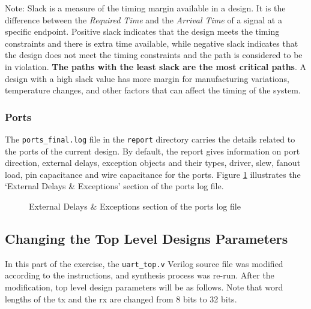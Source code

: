 \documentclass[a4paper,11pt]{article}%
\begin{document}
Note: Slack is a measure of the timing margin available in a design. It is the difference between the \textit{Required Time} and the \textit{Arrival Time} of a signal at a specific endpoint. Positive slack indicates that the design meets the timing constraints and there is extra time available, while negative slack indicates that the design does not meet the timing constraints and the path is considered to be in violation. \textbf{The paths with the least slack are the most critical paths}. A design with a high slack value has more margin for manufacturing variations, temperature changes, and other factors that can affect the timing of the system.



\subsubsection{Ports}

The {\tt ports\_final.log} file in the {\tt report} directory carries the details related to the ports of the current design. By default, the report gives information on port direction, external delays, exception objects and their types, driver, slew, fanout load, pin capacitance and wire capacitance for the ports\cite{genus_command_ref_2019}. Figure \ref{fig:ports_log} illustrates the `External Delays \& Exceptions' section of the ports log file.

\begin{figure}[h]
	\centering
	\caption{External Delays \& Exceptions section of the ports log file}
	\label{fig:ports_log}
\end{figure}

\subsection{Changing the Top Level Designs Parameters}

In this part of the exercise, the {\tt uart\_top.v} Verilog source file was modified according to the instructions, and synthesis process was re-run. After the modification, top level design parameters will be as follows. Note that word lengths of the \ac{tx} and the \ac{rx} are changed from 8 bits to 32 bits.
\end{document}
